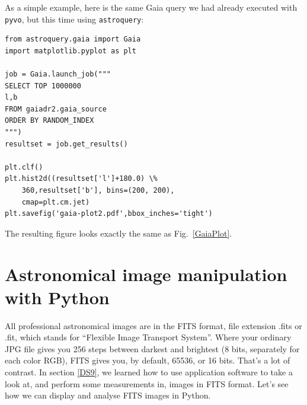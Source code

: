 \documentclass[twocolumn,apj]{openjournal}
\begin{document}
As a simple example, here is the same Gaia query we had already executed with \verb|pyvo|, but this time using \verb|astroquery|:
\begin{lstlisting}
from astroquery.gaia import Gaia
import matplotlib.pyplot as plt

job = Gaia.launch_job("""
SELECT TOP 1000000
l,b
FROM gaiadr2.gaia_source
ORDER BY RANDOM_INDEX
""")
resultset = job.get_results()

plt.clf()
plt.hist2d((resultset['l']+180.0) \%
    360,resultset['b'], bins=(200, 200),
    cmap=plt.cm.jet)
plt.savefig('gaia-plot2.pdf',bbox_inches='tight')
\end{lstlisting}
The resulting figure looks exactly the same as Fig.~\ref{GaiaPlot}.

\section{Astronomical image manipulation with Python}
\label{Images}
All professional astronomical images are in the FITS format, file extension .fits or .fit, which stands for ``Flexible Image Transport System''. Where your ordinary JPG file gives you 256 steps between darkest and brightest (8 bits, separately for each color RGB), FITS gives you, by default, 65536, or 16 bits. That's a lot of contrast. In section \ref{DS9}, we learned how to use application software to take a look at, and perform some measurements in, images in FITS format. Let's see how we can display and analyse FITS images in Python.
\end{document}
